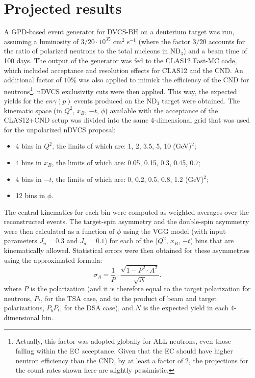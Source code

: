 \section{Projected results}\label{sec_countrate}
A GPD-based event generator for DVCS-BH on a deuterium target was run, assuming a luminosity of $3/20\cdot 10^{35}$ cm$^2$ s$^{-1}$ (where the factor $3/20$ accounts for the ratio of polarized neutrons to the total nucleons in ND$_3$) and a beam time of 100 days. The output of the generator was fed to the CLAS12 Fast-MC code, which included acceptance and resolution effects for CLAS12 and the CND. An additional factor of $10\%$ was also applied to mimick the efficiency of the CND for neutrons\footnote{Actually, this factor was adopted globally for ALL neutrons, even those falling within the EC acceptance. Given that the EC should have higher neutron efficiency than the CND, by at least a factor of 2, the projections for the count rates shown here are slightly pessimistic.}. nDVCS exclusivity cuts were then applied. This way, the expected yields for the $en\gamma(p)$ events produced on the ND$_3$ target were obtained. The kinematic space (in $Q^2$, $x_B$, $-t$, $\phi$) available with the acceptance of the CLAS12+CND setup was divided into the same 4-dimensional grid that was used for the unpolarized nDVCS proposal:
\begin{itemize}
\item{4 bins in $Q^2$, the limits of which are: 1, 2, 3.5, 5, 10 (GeV)$^2$;}
\item{4 bins in $x_B$, the limits of which are: 0.05, 0.15, 0.3, 0.45, 0.7;}
\item{4 bins in $-t$, the limits of which are: 0, 0.2, 0.5, 0.8, 1.2 (GeV)$^2$;}
\item{12 bins in $\phi$.}
\end{itemize}

The central kinematics for each bin were computed as weighted averages over the reconstructed events. The target-spin asymmetry and the double-spin asymmetry were then calculated as a function of $\phi$ using the VGG model (with input parameters $J_u=0.3$ and $J_d=0.1$) for each of the ($Q^2$, $x_B$, $-t$) bins that are kinematically allowed. 
Statistical errors were then obtained for these asymmetries using the approximated formula: 
\begin{equation}\label{error_asym}
\sigma_A = \frac{1}{P}\cdot \frac{\sqrt{1-P^2\cdot A^2}}{\sqrt{N}}.
\end{equation}
where $P$ is the polarization (and it is therefore equal to the target polarization for neutrons, $P_t$, for the TSA case, and to the product of beam and target polarizations, $P_bP_t$, for the DSA case), and $N$ is the expected yield in each 4-dimensional bin. %


